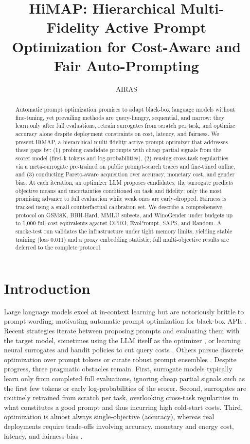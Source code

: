 \documentclass{article}
\title{HiMAP: Hierarchical Multi-Fidelity Active Prompt Optimization for Cost-Aware and Fair Auto-Prompting}
\author{AIRAS}
\begin{document}
\maketitle

\begin{abstract}
Automatic prompt optimization promises to adapt black-box language models without fine-tuning, yet prevailing methods are query-hungry, sequential, and narrow: they learn only after full evaluations, retrain surrogates from scratch per task, and optimize accuracy alone despite deployment constraints on cost, latency, and fairness. We present HiMAP, a hierarchical multi-fidelity active prompt optimizer that addresses these gaps by: (1) probing candidate prompts with cheap partial signals from the scorer model (first-k tokens and log-probabilities), (2) reusing cross-task regularities via a meta-surrogate pre-trained on public prompt-search traces and fine-tuned online, and (3) conducting Pareto-aware acquisition over accuracy, monetary cost, and gender bias. At each iteration, an optimizer LLM proposes candidates; the surrogate predicts objective means and uncertainties conditioned on task and fidelity; only the most promising advance to full evaluation while weak ones are early-dropped. Fairness is tracked using a small counterfactual calibration set. We describe a comprehensive protocol on GSM8K, BBH-Hard, MMLU subsets, and WinoGender under budgets up to 1,000 full-cost equivalents against OPRO, EvoPrompt, SAPS, and Random. A smoke-test run validates the infrastructure under tight memory limits, yielding stable training (loss 0.011) and a proxy embedding statistic; full multi-objective results are deferred to the complete protocol.
\end{abstract}

\section{Introduction}
Large language models excel at in-context learning but are notoriously brittle to prompt wording, motivating automatic prompt optimization for black-box APIs \cite{yang-2023-large,arora-2022-ask}. Recent strategies iterate between proposing prompts and evaluating them with the target model, sometimes using the LLM itself as the optimizer \cite{yang-2023-large}, or learning neural surrogates and bandit policies to cut query costs \cite{lin-2023-use,chen-2023-instructzero}. Others pursue discrete optimization over prompt tokens \cite{wen-2023-hard} or curate robust prompt ensembles \cite{arora-2022-ask}. Despite progress, three pragmatic obstacles remain. First, surrogate models typically learn only from completed full evaluations, ignoring cheap partial signals such as the first few tokens or early log-probabilities of the scorer. Second, surrogates are routinely retrained from scratch per task, overlooking cross-task regularities in what constitutes a good prompt and thus incurring high cold-start costs. Third, optimization is almost always single-objective (accuracy), whereas real deployments require trade-offs involving accuracy, monetary and energy cost, latency, and fairness-bias \cite{ma-2023-fairness}.
\end{document}
